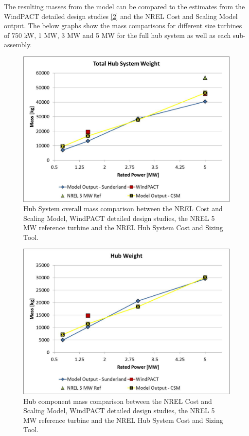 \documentclass[letterpaper,10pt,openany,oneside]{sphinxmanual}
\begin{document}
The resulting masses from the model can be compared to the estimates from the WindPACT detailed design studies {\hyperref[theory:2]{{[}2{]}}} and the NREL Cost and Scaling Model output.  The below graphs show the mass comparisons for different size turbines of 750 kW, 1 MW, 3 MW and 5 MW for the full hub system as well as each sub-assembly.
\begin{figure}[htbp]
\centering
\capstart

\includegraphics[width=6.5in]{hubsysmass.pdf}
\caption{Hub System overall mass comparison between the NREL Cost and Scaling Model, WindPACT detailed design studies, the NREL 5 MW reference turbine and the NREL Hub System Cost and Sizing Tool.}\label{theory:hubsysmass}\end{figure}
\begin{figure}[htbp]
\centering
\capstart

\includegraphics[width=6.5in]{hubmass.pdf}
\caption{Hub component mass comparison between the NREL Cost and Scaling Model, WindPACT detailed design studies, the NREL 5 MW reference turbine and the NREL Hub System Cost and Sizing Tool.}\label{theory:hubmass}\end{figure}
\end{document}
